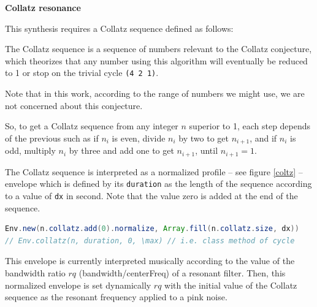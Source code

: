 \noindent \textbf{
  Collatz resonance }

\label{colres}

\smallskip
This synthesis requires a Collatz sequence defined as follows:

{The Collatz sequence is a sequence of numbers relevant to the Collatz conjecture, which theorizes that any number using this algorithm will eventually be reduced to 1 or stop on the trivial cycle \texttt{(4 2 1)}.

Note that in this work, according to the range of numbers we might use, we are not concerned about this conjecture.

So, to get a Collatz sequence from any integer $n$ superior to 1, each step depends of the previous such as if $n_i$ is even, divide $n_i$ by two to get $n_{i+1}$, and if $n_i$ is odd, multiply $n_i$ by three and add one to get $n_{i+1}$, until $n_{i+1}=1$. 
} 


The Collatz sequence is interpreted as a normalized profile -- see figure \ref{coltz} -- envelope which is defined by its \texttt{duration} as the length of the sequence according to a value of \texttt{dx} in second. Note that the value zero is added at the end of the sequence.
\begin{lstlisting}[basicstyle=\footnotesize\ttfamily,language=Java]
Env.new(n.collatz.add(0).normalize, Array.fill(n.collatz.size, dx))
// Env.collatz(n, duration, 0, \max) // i.e. class method of cycle
\end{lstlisting} 


  

This envelope is currently interpreted musically according to the value of the bandwidth ratio $rq$ (bandwidth/centerFreq) of a resonant filter.  Then, this normalized envelope is set dynamically $rq$ with the initial value of the Collatz sequence as the resonant frequency applied to a pink noise.

